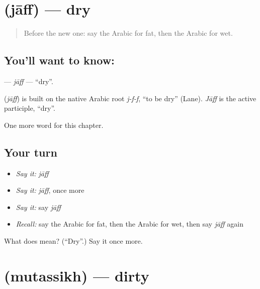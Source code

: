 \section[\texorpdfstring{\ar{جاف} (jāff)}{جاف (jāff)}]{ (jāff) — dry}

\label{lesson:AR-C151-jaff}



\begin{quote}
Before the new one: say the Arabic for fat, then the Arabic for wet.
\end{quote}

\subsection*{You'll want to know: }
\textbf{} — \emph{jāff} — \textquotedblleft{}dry\textquotedblright{}.

\begin{cousinweb}
\textbf{} (\emph{jāff}) is built on the native Arabic root \emph{j-f-f}, \textquotedblleft{}to be dry\textquotedblright{} (Lane). \emph{Jāff} is the active participle, \textquotedblleft{}dry\textquotedblright{}.
\end{cousinweb}

\begin{grammarlens}[title={What you've built}]
One more word for this chapter.
\end{grammarlens}

\subsection*{Your turn}
\begin{itemize}
\raggedright
  \item \emph{Say it:} \emph{jāff}
  \item \emph{Say it:} \emph{jāff}, once more
  \item \emph{Say it:} say \emph{jāff}
  \item \emph{Recall:} say the Arabic for fat, then the Arabic for wet, then say \emph{jāff} again
\end{itemize}

\begin{tcolorbox}[breakable,colback=teal!4,colframe=teal!35!black,title={Before you move on}]
What does  mean? (\textquotedblleft{}Dry\textquotedblright{}.) Say it once more.
\end{tcolorbox}
\section[\texorpdfstring{\ar{متسخ} (mutassikh)}{متسخ (mutassikh)}]{ (mutassikh) — dirty}

